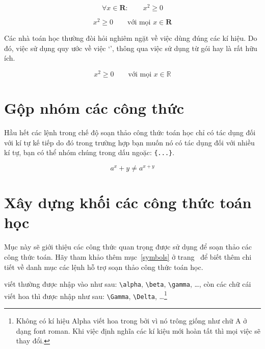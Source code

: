 \begin{example}
\begin{equation}
\forall x \in \mathbf{R}:
\qquad x^{2} \geq 0
\end{equation}
\end{example}
\begin{example}
\begin{equation}
x^{2} \geq 0\qquad
\textrm{với mọi }x\in\mathbf{R}
\end{equation}
\end{example}

Các nhà toán học thường đòi hỏi nghiêm ngặt về việc dùng đúng các kí hiệu. Do đó, việc sử dụng quy ước về việc `', thông qua việc sử dụng  từ gói  hay  là rất hữu ích.

\begin{example}
\begin{displaymath}
x^{2} \geq 0\qquad \textrm{với mọi }
x\in\mathbb{R}
\end{displaymath}
\end{example}

\section{Gộp nhóm các công thức}
Hầu hết các lệnh trong chế độ soạn thảo công thức toán học chỉ có tác dụng đối với kí tự kế tiếp do đó trong trường hợp bạn muốn nó có tác dụng đối với nhiều kí tự, bạn có thể nhóm chúng trong dấu ngoặc: \verb|{...}|.

\begin{example}
\begin{equation}
a^x+y \neq a^{x+y}
\end{equation}
\end{example}

\section{Xây dựng khối các công thức toán học}
Mục này sẽ giới thiệu các công thức quan trọng được sử dụng để soạn thảo các công thức toán. Hãy tham khảo thêm mục~\ref{symbols} ở trang~\pageref{symbols} để biết thêm chi tiết về danh mục các lệnh hỗ trợ soạn thảo công thức toán học.

\textbf{} viết thường được nhập vào như sau:
\verb|\alpha|, \verb|\beta|, \verb|\gamma|, \ldots, còn các chữ cái viết hoa thì được nhập như sau: \verb|\Gamma|, \verb|\Delta|, \ldots \footnote{Không có kí hiệu Alpha viết hoa trong \LaTeXe{} bởi vì nó trông giống như chữ A ở dạng font roman. Khi việc định nghĩa các kí kiệu mới hoàn tất thì mọi việc sẽ thay đổi.}

